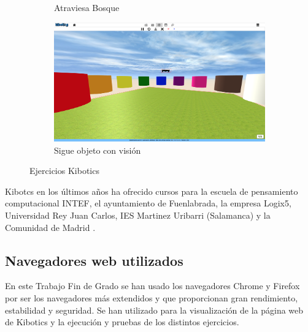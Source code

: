 \begin{figure}[H]
\begin{subfigure}{.5\textwidth}
  \caption{Atraviesa Bosque}
  \label{fig:sub-third}
\end{subfigure}
\begin{subfigure}{.5\textwidth}
  \centering
  \includegraphics[width=.95\linewidth]{chapters/images/colores.png}  
  \caption{Sigue objeto con visión}
  \label{fig:sub-fourth}
\end{subfigure}
\caption{Ejercicios Kibotics}
\label{fig:partes robot}
\end{figure}


Kibotcs en los últimos años ha ofrecido cursos para la escuela de pensamiento computacional INTEF, el ayuntamiento de Fuenlabrada, la empresa Logix5, Universidad Rey Juan Carlos, IES Martinez Uribarri (Salamanca) y la Comunidad de Madrid \cite{kiboticspdf}.


\subsection{Navegadores web utilizados}

En este Trabajo Fin de Grado se han usado los navegadores Chrome y Firefox por ser los navegadores más extendidos y que proporcionan gran rendimiento, estabilidad y seguridad. Se han utilizado para la visualización de la página web de Kibotics y la ejecución y pruebas de los distintos ejercicios. 
